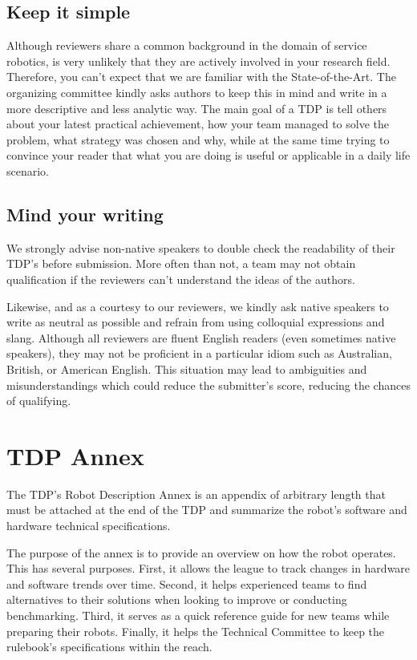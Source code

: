 \documentclass[runningheads,a4paper]{llncs}
\begin{document}
\subsection{Keep it simple}
Although reviewers share a common background in the domain of service robotics, is very unlikely that they are actively involved in your research field.
Therefore, you can't expect that we are familiar with the State-of-the-Art.
The organizing committee kindly asks authors to keep this in mind and write in a more descriptive and less analytic way.
The main goal of a TDP is tell others about your latest practical achievement, how your team managed to solve the problem, what strategy was chosen and why, while at the same time trying to convince your reader that what you are doing is useful or applicable in a daily life scenario.

\subsection{Mind your writing}
We strongly advise non-native speakers to double check the readability of their TDP's before submission.
More often than not, a team may not obtain qualification if the reviewers can't understand the ideas of the authors.

Likewise, and as a courtesy to our reviewers, we kindly ask native speakers to write as neutral as possible and refrain from using colloquial expressions and slang.
Although all reviewers are fluent English readers (even sometimes native speakers), they may not be proficient in a particular idiom such as Australian, British, or American English.
This situation may lead to ambiguities and misunderstandings which could reduce the submitter's score, reducing the chances of qualifying.

\section{TDP Annex}
The TDP's Robot Description Annex is an appendix of arbitrary length that must be attached at the end of the TDP and summarize the robot's software and hardware technical specifications.

The purpose of the annex is to provide an overview on how the robot operates.
This has several purposes.
First, it allows the league to track changes in hardware and software trends over time.
Second, it helps experienced teams to find alternatives to their solutions when looking to improve or conducting benchmarking.
Third, it serves as a quick reference guide for new teams while preparing their robots.
Finally, it helps the Technical Committee to keep the rulebook's specifications within the reach.
\end{document}
